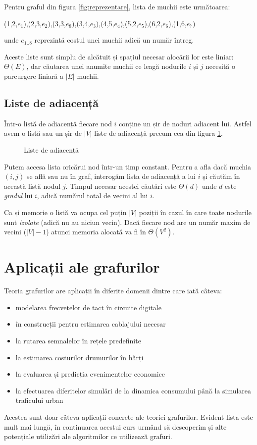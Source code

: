 Pentru graful din figura \ref{fig:reprezentare}, lista de muchii este următoarea:

{ (1,2,$e_1$),(2,3,$e_2$),(3,3,$e_8$),(3,4,$e_3$),(4,5,$e_4$),(5,2,$e_5$),(6,2,$e_6$),(1,6,$e_7$)}

unde $e_{1..8}$ reprezintă costul unei muchii adică un număr întreg.

Aceste liste sunt simplu de alcătuit și spațiul necesar alocării lor este liniar: $\Theta(E)$, dar căutarea unei anumite muchii ce leagă nodurile $i$ și $j$ necesită o parcurgere liniară a $\left |  E \right | $ muchii.

\subsection{Liste de adiacență}

Într-o listă de adiacență fiecare nod $i$ conține un șir de noduri adiacent lui. Astfel avem o listă sau un șir de $\left |  V \right | $ liste de adiacență precum cea din figura \ref{fig:adiacenta}.


\begin{figure}[H] 
	\centering	
	{
	}
	\caption{Liste de adiacență} 
	\label{fig:adiacenta}
\end{figure}

Putem accesa lista oricărui nod într-un timp constant. Pentru a afla dacă muchia $(i,j)$ se află sau nu în graf, interogăm lista de adiacență a lui $i$ și căutăm în această listă nodul $j$. Timpul necesar acestei căutări este $\Theta(d)$ unde $d$ este \textit{gradul} lui $i$, adică numărul total de vecini al lui $i$.

Ca și memorie o listă va ocupa cel puțin  $\left |  V \right | $ poziții în cazul în care toate nodurile sunt \textit{izolate} (adică nu au niciun vecin). Dacă fiecare nod are un număr maxim de vecini ($\left |  V \right | -1 $) atunci memoria alocată va fi în $\Theta( V^2 )$.


\section{Aplicații ale grafurilor}

Teoria grafurilor are aplicații în diferite domenii dintre care iată câteva:


\begin{itemize}
	\item {modelarea frecvețelor de tact în circuite digitale}
	\item {în construcții pentru estimarea cablajului necesar}
	\item {la rutarea semnalelor în rețele predefinite}
	\item {la estimarea costurilor drumurilor în hărți}
	\item {la evaluarea și predicția evenimentelor economice}
	\item {la efectuarea diferitelor simulări de la dinamica consumului până la simularea traficului urban}	
\end{itemize}

Acestea sunt doar câteva aplicații concrete ale teoriei grafurilor. 
Evident lista este mult mai lungă, în continuarea acestui curs urmând să descoperim și alte potențiale utilizări ale algoritmilor ce utilizează grafuri.
